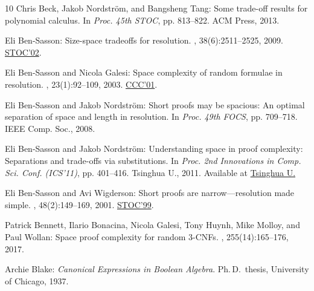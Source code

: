 \documentclass[11pt]{article}
\numberwithin{equation}{section}
\theoremstyle{definition}
\theoremstyle{plain}
\begin{document}
\begin{thebibliography}{10}
{\sc Chris Beck, Jakob Nordström, and Bangsheng Tang}: Some trade-off results
  for polynomial calculus.
\newblock In {\em Proc. 45th STOC}, pp. 813--822. ACM Press, 2013.
\newblock [\epfmtdoi{10.1145/2488608.2488711}]

{\sc Eli {Ben-Sasson}}: Size-space tradeoffs for resolution.
, 38(6):2511--2525, 2009.
\newblock \prelim \href{https://doi.org/10.1145/509907.509975}{STOC'02}.
\newblock [\epfmtdoi{10.1137/080723880}]

{\sc Eli {Ben-Sasson} and Nicola Galesi}: Space complexity of random formulae
  in resolution.
, 23(1):92--109, 2003.
\newblock \prelim \href{https://doi.org/10.1109/CCC.2001.933871}{CCC'01}.

{\sc Eli {Ben-Sasson} and Jakob Nordström}: Short proofs may be spacious: {A}n
  optimal separation of space and length in resolution.
\newblock In {\em Proc. 49th FOCS}, pp. 709--718. IEEE Comp. Soc., 2008.

{\sc Eli {Ben-Sasson} and Jakob Nordström}: Understanding space in proof
  complexity: Separations and trade-offs via substitutions.
\newblock In {\em Proc. 2nd Innovations in Comp. Sci. Conf. (ICS'11)}, pp.
  401--416. Tsinghua U., 2011.
\newblock Available at
  \href{http://conference.iiis.tsinghua.edu.cn/ICS2011/content/papers/3.html}{Tsinghua
  U.}

{\sc Eli {Ben-Sasson} and Avi Wigderson}: Short proofs are narrow---resolution
  made simple.
, 48(2):149--169, 2001.
\newblock \prelim \href{https://doi.org/10.1145/301250.301392}{STOC'99}.
\newblock [\epfmtdoi{10.1145/375827.375835}]

{\sc Patrick Bennett, Ilario Bonacina, Nicola Galesi, Tony Huynh, Mike Molloy,
  and Paul Wollan}: Space proof complexity for random $3$-{CNF}s.
, 255(14):165--176, 2017.
\newblock [\epfmtdoi{10.1016/j.ic.2017.06.003}]

{\sc Archie Blake}: {\em Canonical Expressions in {B}oolean Algebra}.
\newblock Ph.\,D.\ thesis, University of Chicago, 1937.


\end{thebibliography}
\end{document}
